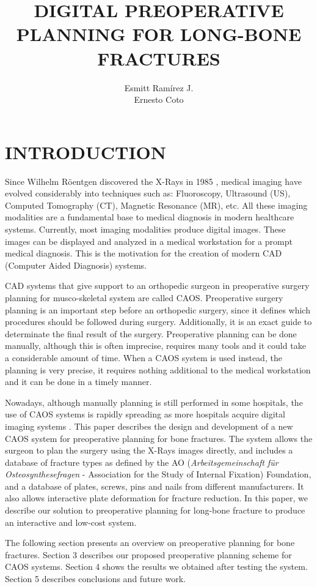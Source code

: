 \documentclass{cimenics}
\title{DIGITAL PREOPERATIVE PLANNING FOR LONG-BONE FRACTURES}
\author{Esmitt Ram\'irez J.\\Ernesto Coto}
\author{}
\begin{document}
\section{INTRODUCTION}

Since Wilhelm R\"{o}entgen discovered the X-Rays in 1985
\cite{HOLL90}, medical imaging have evolved considerably into
techniques such as: Fluoroscopy, Ultrasound (US), Computed
Tomography (CT), Magnetic Resonance (MR), etc. All these imaging
modalities are a fundamental base to medical diagnosis in modern
healthcare systems. Currently, most imaging modalities produce
digital images. These images can be displayed and analyzed in a
medical workstation for a prompt medical diagnosis. This is the
motivation for the creation of modern CAD (Computer Aided
Diagnosis) systems.

CAD systems that give support to an orthopedic surgeon in
preoperative surgery planning for musco-skeletal system are called
CAOS. Preoperative surgery planning is an important step before an orthopedic surgery, since
it defines which procedures should be followed during surgery.
Additionally, it is an exact guide to determinate the final result
of the surgery. Preoperative planning can be done manually, although
this is often imprecise, requires many tools and it could take a
considerable amount of time. When a CAOS system is used instead,
the planning is very precise, it requires nothing additional to
the medical workstation and it can be done in a timely manner.

Nowadays, although manually planning is still performed in some
hospitals, the use of CAOS systems is rapidly spreading as more
hospitals acquire digital imaging systems \cite{GIGE00}. This
paper describes the design and development of a new CAOS system
for preoperative planning for bone fractures. The system
allows the surgeon to plan the surgery using the X-Rays images
directly, and includes a database of fracture types as
defined by the AO (\emph{Arbeitsgemeinschaft f\"ur
Osteosynthesefragen} - Association for the Study of Internal
Fixation) Foundation, and a database of plates, screws, pins and
nails from different manufacturers. It also allows interactive
plate deformation for fracture reduction. In this paper, we
describe our solution to preoperative planning for long-bone
fracture to produce an interactive and low-cost system.

The following section presents an overview on preoperative
planning for bone fractures. Section 3 describes our proposed
preoperative planning scheme for CAOS systems. Section 4 shows the
results we obtained after testing the system. Section 5 describes
conclusions and future work.
\end{document}
